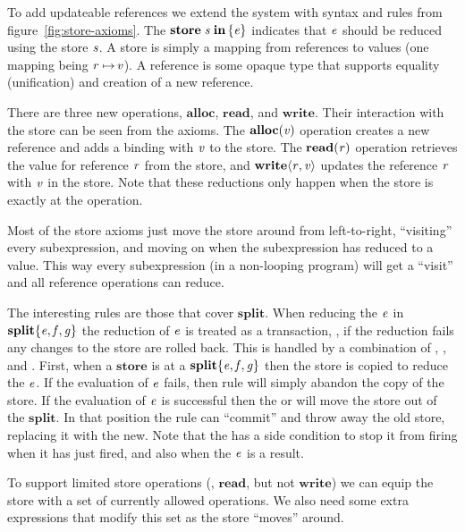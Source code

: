 To add updateable references we extend the system with syntax and rules from figure~\ref{fig:store-axioms}.
The \ensuremath{\textbf{store}\;\Varid{s}\;\textbf{in}\,\{\Varid{e}\}} indicates that \ensuremath{\Varid{e}} should be reduced using the store \ensuremath{\Varid{s}}.
A store is simply a mapping from references to values (one mapping being \ensuremath{\Varid{r}\mapsto\!\Varid{v}}).
A reference is some opaque type that supports equality (unification) and creation of a new reference.

There are three new operations, \ensuremath{\textbf{alloc}}, \ensuremath{\textbf{read}}, and \ensuremath{\textbf{write}}.
Their interaction with the store can be seen from the axioms.
The \ensuremath{\textbf{alloc}(\Varid{v})} operation creates a new reference and adds a binding with \ensuremath{\Varid{v}} to the store.
The \ensuremath{\textbf{read}(\Varid{r})} operation retrieves the value for reference \ensuremath{\Varid{r}} from the store,
and \ensuremath{\textbf{write}\langle\Varid{r},\Varid{v}\rangle} updates the reference \ensuremath{\Varid{r}} with \ensuremath{\Varid{v}} in the store.
Note that these reductions only happen when the store is exactly at the operation.

Most of the store axioms just move the store around from left-to-right, ``visiting'' every subexpression,
and moving on when the subexpression has reduced to a value.
This way every subexpression (in a non-looping program) will get a ``visit'' and all reference operations
can reduce.

The interesting rules are those that cover \ensuremath{\textbf{split}}.
When reducing the \ensuremath{\Varid{e}} in \ensuremath{\textbf{split}\{\Varid{e},\Varid{f},\Varid{g}\}} the reduction of \ensuremath{\Varid{e}} is treated as a transaction, {\ie},
if the reduction fails any changes to the store are rolled back.
This is handled by a combination of , , and .
First, when a \ensuremath{\textbf{store}} is at a \ensuremath{\textbf{split}\{\Varid{e},\Varid{f},\Varid{g}\}} then the store is copied to reduce the \ensuremath{\Varid{e}}.
If the evaluation of \ensuremath{\Varid{e}} fails, then rule  will simply abandon the copy of the store.
If the evaluation of \ensuremath{\Varid{e}} is successful then the  or  will move the store out of the \ensuremath{\textbf{split}}.
In that position the  rule can ``commit'' and throw away the old store, replacing it with the new.
Note that the  has a side condition to stop it from firing when it has just fired,
and also when the \ensuremath{\Varid{e}} is a result.

To support limited store operations ({\eg}, \ensuremath{\textbf{read}}, but not \ensuremath{\textbf{write}}) we can equip the store with a set of currently allowed operations.
We also need some extra expressions that modify this set as the store ``moves'' around.

